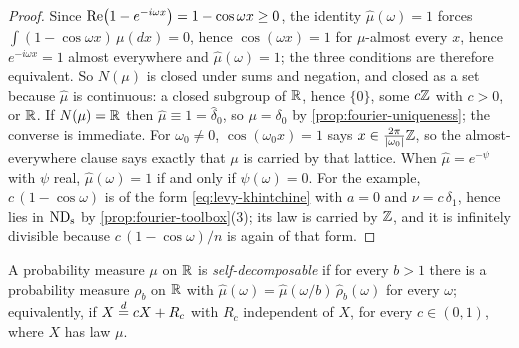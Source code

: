 \begin{proof}\leanok
Since $\operatorname{Re}\bigl(1 - e^{-i\omega x}\bigr) = 1 - \cos\omega x \ge 0$, the identity
$\hat\mu(\omega) = 1$ forces $\int (1 - \cos\omega x)\,\mu(dx) = 0$, hence
$\cos(\omega x) = 1$ for $\mu$-almost every $x$, hence $e^{-i\omega x} = 1$ almost everywhere
and $\hat\mu(\omega) = 1$; the three conditions are therefore equivalent. So $N(\mu)$ is
closed under sums and negation, and closed as a set because $\hat\mu$ is continuous: a closed
subgroup of $\mathbb{R}$, hence $\{0\}$, some $c\mathbb{Z}$ with $c > 0$, or $\mathbb{R}$. If $N(\mu) = \mathbb{R}$ then
$\hat\mu \equiv 1 = \hat\delta_0$, so $\mu = \delta_0$ by \ref{prop:fourier-uniqueness}; the
converse is immediate. For $\omega_0 \ne 0$, $\cos(\omega_0 x) = 1$ says
$x \in \tfrac{2\pi}{|\omega_0|}\mathbb{Z}$, so the almost-everywhere clause says exactly that $\mu$
is carried by that lattice. When $\hat\mu = e^{-\psi}$ with $\psi$ real, $\hat\mu(\omega) = 1$
if and only if $\psi(\omega) = 0$. For the example, $c\,(1-\cos\omega)$ is of the form
\ref{eq:levy-khintchine} with $a = 0$ and $\nu = c\,\delta_1$, hence lies in $\mathrm{ND}_{\mathrm{s}}$ by
\ref{prop:fourier-toolbox}(3); its law is carried by $\mathbb{Z}$, and it is infinitely divisible
because $c\,(1-\cos\omega)/n$ is again of that form.
\end{proof}

\begin{definition}\label{def:self-decomposable}
\leanok
{}
A probability measure $\mu$ on $\mathbb{R}$ is \emph{self-decomposable} if for every $b > 1$ there is
a probability measure $\rho_b$ on $\mathbb{R}$ with
$\hat\mu(\omega) = \hat\mu(\omega/b)\,\hat\rho_b(\omega)$ for every $\omega$; equivalently, if
$X \stackrel{d}{=} cX + R_c$ with $R_c$ independent of $X$, for every $c \in (0,1)$, where $X$ has law
$\mu$.
\statusT
\end{definition}

